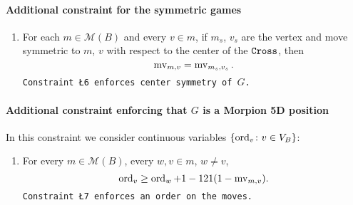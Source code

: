 \paragraph*{Additional constraint for the symmetric games} 
\begin{enumerate}[label=\L{\arabic*}.]\addtocounter{enumi}{5}
\item For each $m \in \mathcal{M}(B)$ and every $v \in m$, if $m_s$, $v_s$ are the vertex and move symmetric to $m$, $v$ with respect to the center of the $\texttt{Cross}$, then
\[
	\operatorname{mv}_{m,v} = \operatorname{mv}_{m_s, v_s}.
\]
\noindent\texttt{\small Constraint \L{6} enforces center symmetry of $G$. }
\end{enumerate}

\paragraph*{Additional constraint enforcing that $G$ is a Morpion 5D position} 
In this constraint we consider  continuous variables $\{ \operatorname{ord}_v \colon v \in V_B \}$:
\begin{enumerate}[label=\L{\arabic*}.]\addtocounter{enumi}{6}
\item For every $m \in \mathcal{M}(B)$, every $w, v \in m$, $w \neq v$,
\[
	\operatorname{ord}_v \geq \operatorname{ord}_w + 1 - 121 (1 - \operatorname{mv}_{m, v}).
\]
\noindent\texttt{\small Constraint \L{7} enforces an order on the moves. }
\end{enumerate}


